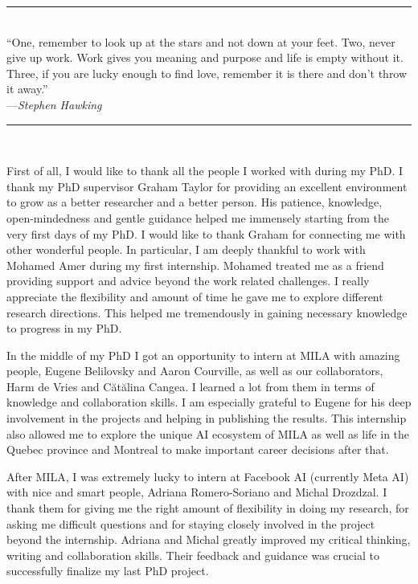 
\vspace{-18pt}
\begin{center}
    \begin{minipage}[t]{0.8\textwidth}
    \centering
    \par\noindent\rule{0.9\textwidth}{0.4pt} \\
    ``One, remember to look up at the stars and not down at your feet. Two, never give up work. Work gives you meaning and purpose and life is empty without it. Three, if you are lucky enough to find love, remember it is there and don't throw it away.'' \\
    ---\textit{Stephen Hawking}
    \par\noindent\rule{0.9\textwidth}{0.4pt} \\
\end{minipage}
\end{center}

\vspace{18pt}

First of all, I would like to thank all the people I worked with during my PhD.
I thank my PhD supervisor Graham Taylor for providing an excellent environment to grow as a better researcher and a better person. His patience, knowledge, open-mindedness and gentle guidance helped me immensely starting from the very first days of my PhD. I would like to thank Graham for connecting me with other wonderful people. In particular, I am deeply thankful to work with Mohamed Amer during my first internship. Mohamed treated me as a friend providing support and advice beyond the work related challenges. I really appreciate the flexibility and amount of time he gave me to explore different research directions. This helped me tremendously in gaining necessary knowledge to progress in my PhD. 

In the middle of my PhD I got an opportunity to intern at MILA with amazing people, Eugene Belilovsky and Aaron Courville, as well as our collaborators, Harm de Vries and C{\u{a}}t{\u{a}}lina Cangea. I learned a lot from them in terms of knowledge and collaboration skills. I am especially grateful to Eugene for his deep involvement in the projects and helping in publishing the results. This internship also allowed me to explore the unique AI ecosystem of MILA as well as life in the Quebec province and Montreal to make important career decisions after that.

After MILA, I was extremely lucky to intern at Facebook AI (currently Meta AI) with nice and smart people, Adriana Romero-Soriano and Michal Drozdzal. I thank them for giving me the right amount of flexibility in doing my research, for asking me difficult questions and for staying closely involved in the project beyond the internship. Adriana and Michal greatly improved my critical thinking, writing and collaboration skills. Their feedback and guidance was crucial to successfully finalize my last PhD project.

